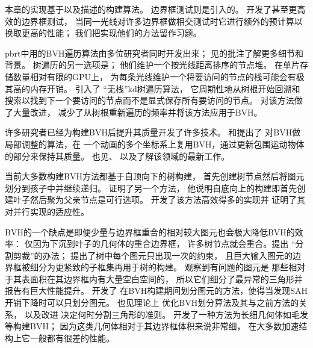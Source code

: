 本章的实现基于\citet{4342588}以及\citet{4342598}描述的构建算法。
边界框测试则是\citet{10.1145/1198555.1198748}引入的。
\citet{10.1080/2151237X.2007.10129248}开发了甚至更高效的边界框测试，
当同一光线对许多边界框做相交测试时它进行额外的预计算以换取更高的性能；
我们把实现他们的方法留作习题。

pbrt中用的BVH遍历算法由多位研究者同时开发出来；
见\citet{bouloshaines2006}的批注了解更多细节和背景。
树遍历的另一选项是\citet{10.1145/15922.15916}；
他们维护一个按光线距离排序的节点堆。
在单片存储数量相对有限的GPU上，
为每条光线维护一个将要访问的节点的栈可能会有极其高的内存开销。
\citet{10.1145/1071866.1071869}引入了
“无栈”kd树遍历算法，
它周期性地从树根开始回溯和搜索以找到下一个要访问的节点而不是显式保存所有要访问的节点。
\citet{10.5555/1921479.1921496}对该方法做了大量改进，
减少了从树根重新遍历的频率并将该方法应用于BVH。

许多研究者已经为构建BVH后提升其质量开发了许多技术。
\citet{10.2312:EGWR:EGSR07:073-084}和\citet{4634624}提出了
对BVH做局部调整的算法，\citet{10.1145/2159616.2159649}在
一个动画的多个坐标系上复用BVH，通过更新包围运动物体的部分来保持其质量。
也见\citet{BittnerFast2013}、\citet{10.1145/2492045.2492055}
以及\citet{BITTNER2015135}了解该领域的最新工作。

当前大多数构建BVH方法都基于自顶向下的树构建，
首先创建树节点然后将图元划分到孩子中并继续递归。
\citet{4634626}证明了另一个方法，
他说明自底向上的构建即首先创建叶子然后聚为父亲节点是可行选项。
\citet{10.1145/2492045.2492054}开发了该方法高效得多的实现并
证明了其对并行实现的适应性。

BVH的一个缺点是即便少量与边界框重合的相对较大图元也会极大降低BVH的效率：
仅因为下沉到叶子的几何体的重合边界框，
许多树节点就会重合。\citet{4342593}提出
“分割剪裁”的办法；
提出了树中每个图元只出现一次的约束，
且巨大输入图元的边界框被细分为更紧致的子框集再用于树的构建。
\citet{4634636}观察到有问题的图元是
那些相对于其表面积在其边界框内有大量空白空间的，
所以它们细分了最异常的三角形并报告有巨大性能提升。
\citet{10.1145/1572769.1572771}开发了
在BVH构建期间划分图元的方法，使得当发现SAH开销下降时可以只划分图元。
也见\citet{10.1145/1572769.1572772}理论上
优化BVH划分算法及其与之前方法的关系，
以及\citet{10.1145/2492045.2492055}改进
决定何时分割三角形的准则。
\citet{10.5555/2980009.2980014}开发了一种方法为长细几何体如毛发等构建BVH；
因为这类几何体相对于其边界框体积来说非常细，
在大多数加速结构上它一般都有很差的性能。

